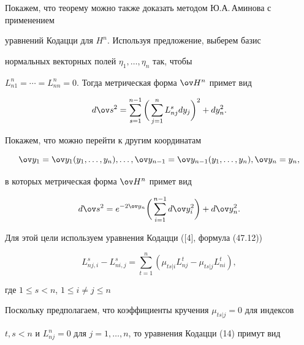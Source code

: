 \begin{note}


Покажем, что теорему можно также доказать методом Ю.А.\,Аминова с применением 


уравнений Кодацци для $H^n$. Используя предложение, выберем базис 


нормальных векторных полей $\eta_1,\dotsc,\eta_n$ так, чтобы 


$L^n_{n1}=\dotsb=L^n_{nn}=0$. Тогда метрическая форма $\ov H{}^n$ примет вид 


\begin{equation*}


d \ov s{}^2= \sum ^{n-1}_{s=1} \bigg(


\sum^n_{j=1}L^s_{nj}dy_j \bigg)^2+dy_n^2.


\end{equation*}


Покажем, что можно перейти к другим координатам 


$$


\ov y_1=\ov y_1(y_1,\dotsc,y_n),\dotsc, 


\ov y_{n-1}=\ov y_{n-1}(y_1,\dotsc,y_n),\ov y_n=y_n,


$$


в которых метрическая форма $\ov H{}^n$ примет вид 


\begin{equation}


d \ov s{}^2=e^{-2 \ov y_n} \bigg(\sum_{i=1}^{n-1} d \ov y_i^2


\bigg) +d \ov y_n^2.


\end{equation}





Для этой цели используем уравнения Кодацци ([4], формула (47.12))


\begin{equation}


L^s_{nj,i}-L^s_{ni,j}= \sum_{t=1}^n ( \mu_{ts|i}L^t_{nj}- 


\mu_{ts|j}L^t_{ni}),


\end{equation}


где $1\leq s <n $, $1\leq i \neq j \leq n$ 





Поскольку предполагаем, что коэффициенты кручения $\mu_{ts|j}=0$ для индексов 


$t,s<n$ и $L^n_{nj}=0$ для $j=1,\dotsc,n$, то уравнения Кодацци (14) примут вид 



\end{note}
